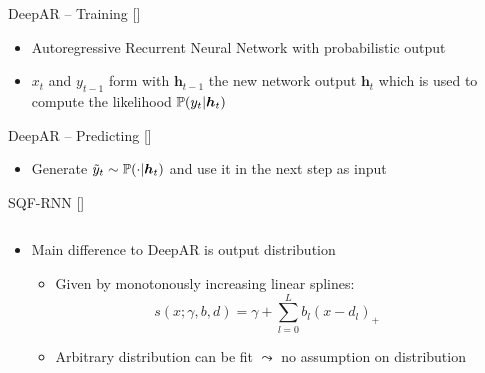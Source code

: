 \documentclass[10pt,aspectratio=169]{beamer}
\begin{document}
\begin{frame}[fragile]{DeepAR -- Training [\cite{Salinas2020}]}
    \begin{center}
        
    \end{center}
    \begin{itemize}
        \item Autoregressive Recurrent Neural Network with probabilistic output
        \item \(x_t\) and \(y_{t-1}\) form with \(\boldsymbol{h}_{t-1}\) the new network output \(\boldsymbol{h}_t\)
        which is used to compute the likelihood \(\P(y_t | \boldsymbol{h}_t)\)
    \end{itemize}
\end{frame}

\begin{frame}[fragile]{DeepAR -- Predicting [\cite{Salinas2020}]}
    \begin{center}
        
    \end{center}
    \begin{itemize}
        \item Generate \(\tilde{y}_t \sim \P(\cdot | \boldsymbol{h}_t)\) and use it in the next step as input
    \end{itemize}
\end{frame}

\begin{frame}{SQF-RNN [\cite{Gasthaus2019}]}
    \begin{columns}
    \begin{column}{0.6\textwidth}
    \begin{itemize}
        \item Main difference to DeepAR is output distribution
        \begin{itemize}
            \item Given by monotonously increasing linear splines: 
            \[ s(x; \gamma, b, d) = \gamma + \sum_{l=0}^L b_l (x - d_l)_+ \]
            \item Arbitrary distribution can be fit \(\leadsto\) no assumption on distribution
        \end{itemize}
    \end{itemize}
    \end{column}

    \begin{column}{0.35\textwidth}
        
    \end{column}
    \end{columns}
\end{frame}
\end{document}
